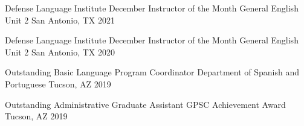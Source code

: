 

\begin{cvhonors}


\cvhonor
{Defense Language Institute December Instructor of the Month} %
{General English Unit 2} %
{San Antonio, TX} %
{2021} %




\cvhonor
{Defense Language Institute December Instructor of the Month} %
{General English Unit 2} %
{San Antonio, TX} %
{2020} %




\cvhonor
{Outstanding Basic Language Program Coordinator} %
{Department of Spanish and Portuguese} %
{Tucson, AZ} %
{2019} %

\cvhonor
{Outstanding Administrative Graduate Assistant} %
{GPSC Achievement Award} %
{Tucson, AZ} %
{2019} %






\end{cvhonors}
